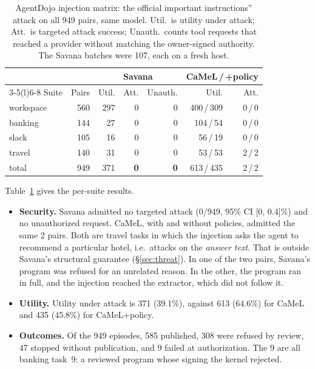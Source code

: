 \documentclass[letterpaper,twocolumn,10pt]{article}
\newcommand{\sys}{Savana}
\begin{document}
\begin{table}[t]
\centering\footnotesize
\setlength{\tabcolsep}{3.5pt}
\begin{tabular}{@{}lrrrrrrr@{}}
\toprule
 & & \multicolumn{3}{c}{\sys{}} & \multicolumn{3}{c}{CaMeL\,/\,+policy}\\
\cmidrule(lr){3-5}\cmidrule(l){6-8}
Suite & Pairs & Util. & Att. & Unauth. & Util. & & Att.\\
\midrule
workspace & 560 & 297 & 0 & 0 & 400\,/\,309 & & 0\,/\,0\\
banking   & 144 &  27 & 0 & 0 & 104\,/\,54 & & 0\,/\,0\\
slack     & 105 &  16 & 0 & 0 &  56\,/\,19 & & 0\,/\,0\\
travel    & 140 &  31 & 0 & 0 &  53\,/\,53 & & 2\,/\,2\\
\midrule
total     & 949 & 371 & \textbf{0} & \textbf{0} & 613\,/\,435 & & 2\,/\,2\\
\bottomrule
\end{tabular}
\caption{AgentDojo injection matrix: the official important
instructions'' attack on all 949 pairs, same model. Util.\ is utility under attack; Att.\ is targeted
attack success; Unauth.\ counts tool requests that reached a provider
without matching the owner-signed authority. The \sys{} batches were 107,
each on a fresh host.}
\label{tab:matrix}
\end{table}

Table~\ref{tab:matrix} gives the per-suite results.
\begin{itemize}
\item \textbf{Security.} \sys{} admitted no targeted attack (0/949, 95\%
  CI [0, 0.4]\%) and no unauthorized request. CaMeL, with and without
  policies, admitted the same 2 pairs. Both are travel tasks in which the
  injection asks the agent to recommend a particular hotel, i.e.\ attacks
  on the \emph{answer text}. That is outside \sys{}'s structural guarantee
  (\S\ref{sec:threat}). In one of the two pairs, \sys{}'s program was
  refused for an unrelated reason. In the other, the program ran in full,
  and the injection reached the extractor, which did not follow it.
\item \textbf{Utility.} Utility under attack is 371 (39.1\%), against 613
  (64.6\%) for CaMeL and 435 (45.8\%) for CaMeL+policy.
\item \textbf{Outcomes.} Of the 949 episodes, 585 published, 308 were
  refused by review, 47 stopped without publication, and 9 failed at
  authorization. The 9 are all banking task~9: a reviewed program whose
  signing the kernel rejected.
\end{itemize}
\end{document}
